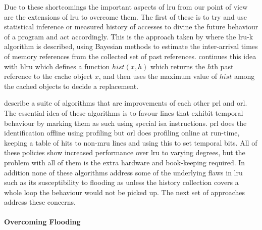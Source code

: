 Due to these shortcomings the important aspects of \gls{lru} from our point of view are the extensions of \gls{lru} to overcome them. The first of these is to try and use statistical inference or measured history of accesses to divine the future behaviour of a program and act accordingly. This is the approach taken by \citet{oneilLRUKPageReplacement1993} where the \gls{lru-k} algorithm is described, using Bayesian methods to estimate the inter-arrival times of memory references from the collected set of past references. \citet{vakaliLRUbasedAlgorithmsWeb2000} continues this idea with \gls{hlru} which defines a function $hist(x,h)$ which returns the $h$th past reference to the cache object $x$, and then uses the maximum value of $hist$ among the cached objects to decide a replacement.

\citet{wongModifiedLRUPolicies2000} describe a suite of algorithms that are improvements of each other \gls{prl} and \gls{orl}. The essential idea of these algorithms is to favour lines that exhibit temporal behaviour by marking them as such using special \gls{isa} instructions. \gls{prl} does the identification offline using profiling but \gls{orl} does profiling online at run-time, keeping a table of hits to non-\gls{mru} lines and using this to set temporal bits. All of these policies show increased performance over \gls{lru} to varying degrees, but the problem with all of them is the extra hardware and book-keeping required. In addition none of these algorithms address some of the underlying flaws in \gls{lru} such as its susceptibility to flooding \cite{glassAdaptivePageReplacement1997} as unless the history collection covers a whole loop the behaviour would not be picked up. The next set of approaches address these concerns.

\paragraph{Overcoming Flooding}

